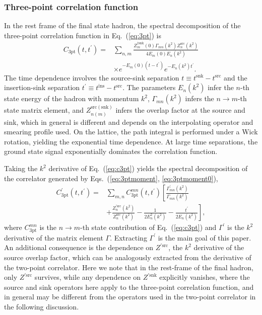 \documentclass[prd,aps,twocolumn,superscriptaddress,tightenlines,nofootinbib,floatfix,preprintnumbers,10pt]{revtex4-1}
\begin{document}
\subsubsection{Three-point correlation function}
In the rest frame of the final state hadron, the spectral decomposition of the three-point correlation function in Eq.~(\ref{eq:3pt}) is
\begin{align}
C_{\mathrm{3pt}}(t,t^\prime) = & \sum_{n,m}\frac{Z^{\dagger \mathrm{snk}}_m(0)\Gamma_{mn}(k^2)Z^{\mathrm{src}}_n(k^2)}{4E_m(0)E_n(k^2)}\nonumber \\
&\times e^{-E_m(0)(t-t^\prime)}e^{-E_n(k^2)t^\prime}. \label{eq:c3pt}
\end{align}
The time dependence involves the source-sink separation $t \equiv t^{\mathrm{snk}}-t^{\mathrm{src}}$ and the insertion-sink separation $t^{\prime}\equiv t^{\mathrm{ins}}-t^{\mathrm{src}}$. The parameters $E_n(k^2)$ infer the $n$-th state energy of the hadron with momentum $k^2$, $\Gamma_{mn}(k^2)$ infers the $n\rightarrow m$-th state matrix element, and $Z_{n(m)}^{\mathrm{src(snk)}}$ infers the overlap factor at the source and sink, which in general is different and depends on the interpolating operator and smearing profile used. On the lattice, the path integral is performed under a Wick rotation, yielding the exponential time dependence. At large time separations, the ground state signal exponentially dominates the correlation function.

Taking the $k^2$ derivative of Eq.~(\ref{eq:c3pt}) yields the spectral decomposition of the correlator generated by Eqs.~(\ref{eq:3ptmoment}, \ref{eq:3ptmoment0}),
\begin{align}
C^{\prime}_{\mathrm{3pt}}(t,t^\prime) = & \sum_{m,n}C^{mn}_{\mathrm{3pt}}(t,t^\prime)\left[\frac{\Gamma^\prime_{mn}(k^2)}{\Gamma_{mn}(k^2)}\right.\nonumber \\
&\left.+\frac{Z^{\prime\mathrm{src}}_n(k^2)}{Z^{\mathrm{src}}_n(k^2)}-\frac{1}{2E_n^2(k^2)}-\frac{t^\prime}{2E_n(k^2)}\right], \label{eq:c3ptm}
\end{align}
where $C^{mn}_{\mathrm{3pt}}$ is the $n\rightarrow m$-th state contribution of Eq.~(\ref{eq:c3pt}) and $\Gamma^\prime$ is the $k^2$ derivative of the matrix element $\Gamma$. Extracting $\Gamma^\prime$ is the main goal of this paper. An additional consequence is the dependence on $Z^{\prime\mathrm{src}}$, the $k^2$ derivative of the source overlap factor, which can be analogously extracted from the derivative of the two-point correlator. Here we note that in the rest-frame of the final hadron, only $Z^{\prime\mathrm{src}}$ survives, while any dependence on  $Z^{\prime\mathrm{snk}}$ explicitly vanishes, where the source and sink operators here apply to the three-point correlation function, and in general may be different from the operators used in the two-point correlator in the following discussion.
\end{document}
